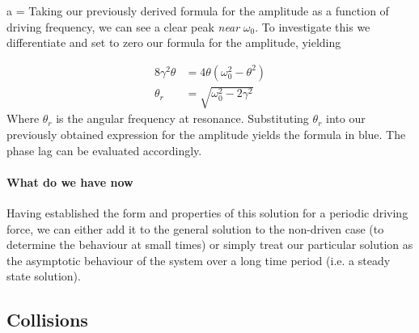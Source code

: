 \begin{bigtest}[Resonance]{a = }
    Taking our previously derived formula for the amplitude as a function of driving frequency, we can see a clear peak \textit{near} $\omega_0$. To investigate this we differentiate and set to zero our formula for the amplitude, yielding 
    
    \begin{align*}
        8\gamma^2\theta &= 4\theta(\omega_0^2 - \theta^2) \\
        \theta_r &= \sqrt{\omega_0^2 - 2\gamma^2}
    \end{align*}
    Where $\theta_r$ is the angular frequency at resonance. Substituting $\theta_r$ into our previously obtained expression for the amplitude yields the formula in blue. The phase lag can be evaluated accordingly.
    
    \paragraph{What do we have now}
    Having established the form and properties of this solution for a periodic driving force, we can either add it to the general solution to the non-driven case (to determine the behaviour at small times) or simply treat our particular solution as the asymptotic behaviour of the system over a long time period (i.e. a steady state solution).
\end{bigtest}

\subsection{Collisions}

